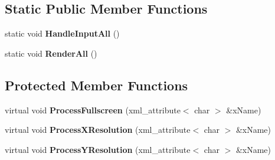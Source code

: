 \subsection*{Static Public Member Functions}
\begin{DoxyCompactItemize}
\item 
\hypertarget{class_k_g_e_1_1_component_window_layer_a30e4e97870e7e913dc1a5576b1601a4c}{static void {\bfseries Handle\-Input\-All} ()}\label{class_k_g_e_1_1_component_window_layer_a30e4e97870e7e913dc1a5576b1601a4c}

\item 
\hypertarget{class_k_g_e_1_1_component_window_layer_a17371ec97dd4ed985e50548b46f17b56}{static void {\bfseries Render\-All} ()}\label{class_k_g_e_1_1_component_window_layer_a17371ec97dd4ed985e50548b46f17b56}

\end{DoxyCompactItemize}
\subsection*{Protected Member Functions}
\begin{DoxyCompactItemize}
\item 
\hypertarget{class_k_g_e_1_1_component_window_layer_ac2c03f63683b526314d12e807a77f8d3}{virtual void {\bfseries Process\-Fullscreen} (xml\-\_\-attribute$<$ char $>$ \&x\-Name)}\label{class_k_g_e_1_1_component_window_layer_ac2c03f63683b526314d12e807a77f8d3}

\item 
\hypertarget{class_k_g_e_1_1_component_window_layer_af2247d2fff32c7b9c915e69ab1780e6e}{virtual void {\bfseries Process\-X\-Resolution} (xml\-\_\-attribute$<$ char $>$ \&x\-Name)}\label{class_k_g_e_1_1_component_window_layer_af2247d2fff32c7b9c915e69ab1780e6e}

\item 
\hypertarget{class_k_g_e_1_1_component_window_layer_a576eaf86f928b883a022121218458889}{virtual void {\bfseries Process\-Y\-Resolution} (xml\-\_\-attribute$<$ char $>$ \&x\-Name)}\label{class_k_g_e_1_1_component_window_layer_a576eaf86f928b883a022121218458889}

\end{DoxyCompactItemize}
